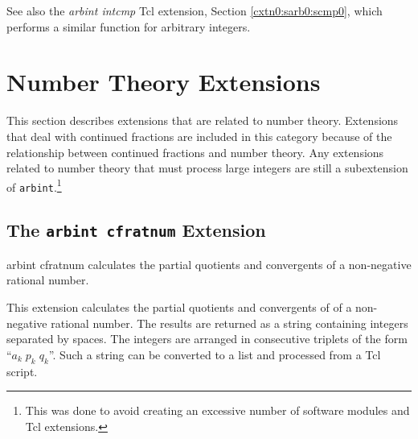 \begin{tclcommandseealso}
See also the \emph{arbint intcmp} Tcl extension,
Section \ref{cxtn0:sarb0:scmp0}, which performs a similar
function for arbitrary integers.
\end{tclcommandseealso}


\section{Number Theory Extensions}
\label{cxtn0:snth0}

This section describes extensions that are related to number theory.
Extensions that deal with continued fractions are included in this
category because of the relationship between continued fractions
and number theory.  Any extensions related to number theory that 
must process large integers are
still a subextension of \texttt{arbint}.\footnote{This was done to
avoid creating an excessive number of software modules and 
Tcl extensions.}


\subsection{The \texttt{arbint cfratnum} Extension}
\label{cxtn0:snth0:scfr0}

\begin{tclcommandname}{arbint cfratnum}%
calculates the partial quotients and convergents of
a non-negative rational number.
\end{tclcommandname}

\begin{tclcommandsynopsis}
\end{tclcommandsynopsis}

\begin{tclcommanddescription}
This extension calculates the partial quotients and convergents of 
of a non-negative rational number.  The results are
returned as a string containing integers separated by spaces.
The integers are arranged in consecutive triplets of the form
``$a_k \; p_k \; q_k$''.  Such a string can be converted to a
list and processed from a Tcl script.
\end{tclcommanddescription}

